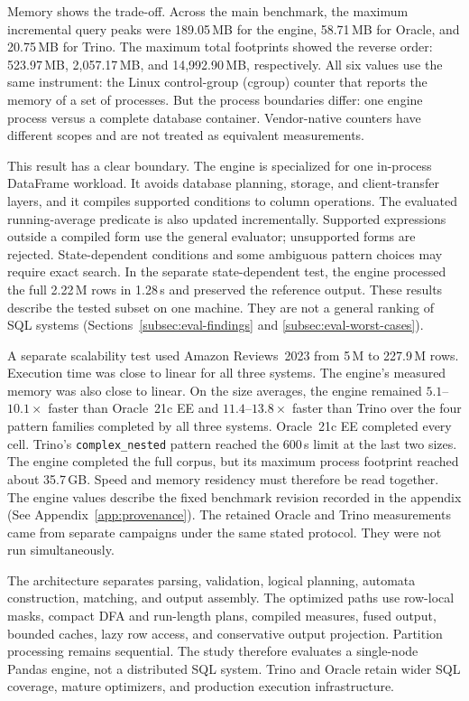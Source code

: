 Memory shows the trade-off.  Across the main benchmark, the maximum
incremental query peaks were 189.05\,MB for the engine, 58.71\,MB for
Oracle, and 20.75\,MB for Trino.  The maximum total footprints showed
the reverse order: 523.97\,MB, 2{,}057.17\,MB, and
14{,}992.90\,MB, respectively.  All six values use the same
instrument: the Linux control-group (cgroup) counter that reports the
memory of a set of processes.  But the process boundaries differ: one
engine process versus a complete database container.  Vendor-native
counters have different scopes and are not treated as equivalent
measurements.

This result has a clear boundary.  The engine is specialized for one
in-process DataFrame workload.  It avoids database planning, storage,
and client-transfer layers, and it compiles supported conditions to
column operations.  The evaluated running-average predicate is also
updated incrementally.  Supported expressions outside a compiled form
use the general evaluator; unsupported forms are rejected.
State-dependent conditions and some ambiguous pattern
choices may require exact search.  In the separate state-dependent
test, the engine processed the full 2.22\,M rows in 1.28\,s and
preserved the reference output.  These results describe the tested
subset on one machine.  They are not a general ranking of SQL systems
(Sections~\ref{subsec:eval-findings} and
\ref{subsec:eval-worst-cases}).

A separate scalability test used Amazon Reviews~2023 from 5\,M to
227.9\,M rows.  Execution time was close to linear for all three
systems.  The engine's measured memory was also close to linear.  On
the size averages, the engine remained
$5.1$--$10.1\times$ faster than Oracle~21c EE and
$11.4$--$13.8\times$ faster than Trino over the four pattern families
completed by all three systems.  Oracle~21c EE completed every
cell.  Trino's \texttt{complex\_nested} pattern reached the 600\,s
limit at the last two sizes.  The engine completed the full corpus, but
its maximum process footprint reached about 35.7\,GB.  Speed and memory
residency must therefore be read together.  The engine values describe the
fixed benchmark revision recorded in the appendix (See
Appendix~\ref{app:provenance}).
The retained Oracle and Trino measurements came from separate campaigns
under the same stated protocol.  They were not run simultaneously.

The architecture separates parsing, validation, logical planning,
automata construction, matching, and output assembly.  The optimized
paths use row-local masks, compact DFA and run-length plans, compiled
measures, fused output, bounded caches, lazy row access, and conservative
output projection.  Partition processing remains sequential.  The
study therefore evaluates a single-node Pandas engine, not a
distributed SQL system.  Trino and Oracle retain wider SQL coverage,
mature optimizers, and production execution infrastructure.

